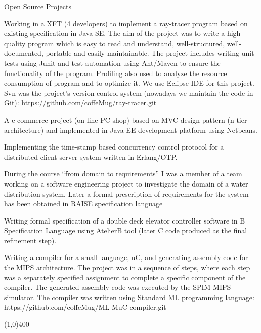 \documentclass{resume}
\begin{document}
\begin{category}{Open Source Projects}

\citembullet
Working in a XFT (4 developers) to implement a ray-tracer program based on existing specification in Java-SE.
The aim of the project was to write a high quality program which is easy to read and understand, 
well-structured, well-documented, portable and easily maintainable.   
The project includes writing unit tests using Junit and test automation using Ant/Maven to ensure the functionality of the program.
Profiling also used to analyze the resource consumption of program and to optimize it. 
We use Eclipse IDE for this project.
Svn was the project's version control system (nowadays we maintain the code in Git):
https://github.com/coffeMug/ray-tracer.git

\citembullet A e-commerce project (on-line PC shop) based on MVC design pattern (n-tier architecture) and 
implemented in Java-EE development platform using Netbeans.

\citembullet
Implementing the time-stamp based concurrency control protocol for a distributed client-server system written in
Erlang/OTP.

\citembullet
During the course ``from domain to requirements'' I was a member of a team working on a software engineering
project to investigate the domain of a water distribution system. Later a formal prescription of 
requirements for the system has been obtained in RAISE specification language

\citembullet
Writing formal specification of a double deck elevator controller software in B Specification Language using
AtelierB tool (later C code produced as the final refinement step).

\citembullet Writing a compiler for a small language, uC, and generating assembly 
code for the MIPS architecture.
The project was in a sequence of steps, where each step was a separately specified 
assignment to complete a specific component of the compiler.
The generated assembly code was executed by the SPIM MIPS simulator. 
The compiler was written using Standard ML programming language:
https://github.com/coffeMug/ML-MuC-compiler.git 

\end{category}

\begin{center}
\line(1,0){400}
\end{center}

\end{document}
